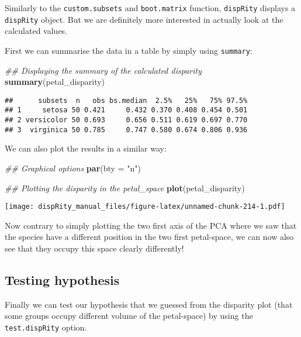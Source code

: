 \documentclass[
]{book}
\newenvironment{Shaded}{\begin{snugshade}}{\end{snugshade}}
\newcommand{\CommentTok}[1]{\textcolor[rgb]{0.56,0.35,0.01}{\textit{#1}}}
\newcommand{\DataTypeTok}[1]{\textcolor[rgb]{0.13,0.29,0.53}{#1}}
\newcommand{\KeywordTok}[1]{\textcolor[rgb]{0.13,0.29,0.53}{\textbf{#1}}}
\newcommand{\NormalTok}[1]{#1}
\newcommand{\StringTok}[1]{\textcolor[rgb]{0.31,0.60,0.02}{#1}}
\begin{document}
Similarly to the \texttt{custom.subsets} and \texttt{boot.matrix} function, \texttt{dispRity} displays a \texttt{dispRity} object.
But we are definitely more interested in actually look at the calculated values.

First we can summarise the data in a table by simply using \texttt{summary}:

\begin{Shaded}
\begin{Highlighting}[]
\CommentTok{\#\# Displaying the summary of the calculated disparity}
\KeywordTok{summary}\NormalTok{(petal\_disparity)}
\end{Highlighting}
\end{Shaded}

\begin{verbatim}
##      subsets  n   obs bs.median  2.5%   25%   75% 97.5%
## 1     setosa 50 0.421     0.432 0.370 0.408 0.454 0.501
## 2 versicolor 50 0.693     0.656 0.511 0.619 0.697 0.770
## 3  virginica 50 0.785     0.747 0.580 0.674 0.806 0.936
\end{verbatim}

We can also plot the results in a similar way:

\begin{Shaded}
\begin{Highlighting}[]
\CommentTok{\#\# Graphical options}
\KeywordTok{par}\NormalTok{(}\DataTypeTok{bty =} \StringTok{"n"}\NormalTok{)}

\CommentTok{\#\# Plotting the disparity in the petal\_space}
\KeywordTok{plot}\NormalTok{(petal\_disparity)}
\end{Highlighting}
\end{Shaded}

\texttt{[image: dispRity\_manual\_files/figure-latex/unnamed-chunk-214-1.pdf]}

Now contrary to simply plotting the two first axis of the PCA where we saw that the species have a different position in the two first petal-space, we can now also see that they occupy this space clearly differently!

\hypertarget{testing-hypothesis}{%
\subsection{Testing hypothesis}\label{testing-hypothesis}}

Finally we can test our hypothesis that we guessed from the disparity plot (that some groups occupy different volume of the petal-space) by using the \texttt{test.dispRity} option.
\end{document}
